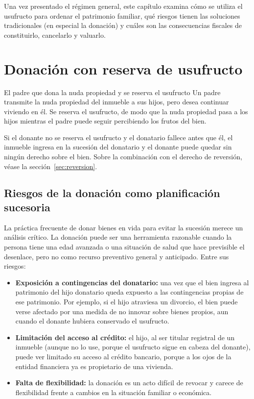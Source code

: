 \documentclass[12pt,oneside]{book}
\begin{document}
Una vez presentado el régimen general, este capítulo examina cómo se utiliza el usufructo para ordenar el patrimonio familiar, qué riesgos tienen las soluciones tradicionales (en especial la donación) y cuáles son las consecuencias fiscales de constituirlo, cancelarlo y valuarlo.

\section{Donación con reserva de usufructo}
\label{sec:donacion}

\begin{example}{El padre que dona la nuda propiedad y se reserva el usufructo}
Un padre transmite la nuda propiedad del inmueble a sus hijos, pero desea continuar viviendo en él. Se reserva el usufructo, de modo que la nuda propiedad pasa a los hijos mientras el padre puede seguir percibiendo los frutos del bien.
\end{example}

\begin{important}
Si el donante no se reserva el usufructo y el donatario fallece antes que él, el inmueble ingresa en la sucesión del donatario y el donante puede quedar sin ningún derecho sobre el bien. Sobre la combinación con el derecho de reversión, véase la sección~\ref{sec:reversion}.
\end{important}

\subsection{Riesgos de la donación como planificación sucesoria}

La práctica frecuente de donar bienes en vida para evitar la sucesión merece un análisis crítico. La donación puede ser una herramienta razonable cuando la persona tiene una edad avanzada o una situación de salud que hace previsible el desenlace, pero no como recurso preventivo general y anticipado. Entre sus riesgos:

\begin{itemize}
    \item \textbf{Exposición a contingencias del donatario:} una vez que el bien ingresa al patrimonio del hijo donatario queda expuesto a las contingencias propias de ese patrimonio. Por ejemplo, si el hijo atraviesa un divorcio, el bien puede verse afectado por una medida de no innovar sobre bienes propios, aun cuando el donante hubiera conservado el usufructo.
    \item \textbf{Limitación del acceso al crédito:} el hijo, al ser titular registral de un inmueble (aunque no lo use, porque el usufructo sigue en cabeza del donante), puede ver limitado su acceso al crédito bancario, porque a los ojos de la entidad financiera ya es propietario de una vivienda.
    \item \textbf{Falta de flexibilidad:} la donación es un acto difícil de revocar y carece de flexibilidad frente a cambios en la situación familiar o económica.
\end{itemize}
\end{document}
